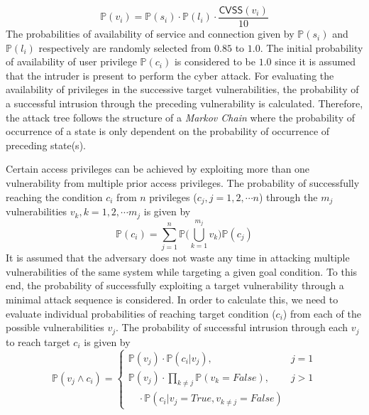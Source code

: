 \begin{equation}
\mathbb{P}(v_i)=\mathbb{P}(s_i)\cdot\mathbb{P}(l_i)\cdot\dfrac{\mathsf{CVSS}(v_i)}{10}
\end{equation}
The probabilities of availability of service and connection given by $\mathbb{P}(s_i)$ and $\mathbb{P}(l_i)$ respectively are randomly selected from $0.85$ to $1.0$. The initial probability of availability of user privilege $\mathbb{P}(c_i)$ is considered to be $1.0$ since it is assumed that the intruder is present to perform the cyber attack. For evaluating the availability of privileges in the successive target vulnerabilities, the probability of a successful intrusion through the preceding vulnerability is calculated. Therefore, the attack tree follows the structure of a \textit{Markov Chain} where the probability of occurrence of a state is only dependent on the probability of occurrence of preceding state(s). 

Certain access privileges can be achieved by exploiting more than one vulnerability from multiple prior access privileges. The probability of successfully reaching the condition $c_i$ from $n$ privileges ($c_j,j=1,2,\cdots n$) through the $m_j$ vulnerabilities $v_k,k=1,2,\cdots m_j$ is given by
\begin{equation}
\mathbb{P}(c_i)=\sum_{j=1}^{n}{\mathbb{P}\bigg(\bigcup_{k=1}^{m_j}v_k\bigg)\mathbb{P}(c_j)}
\end{equation} 
It is assumed that the adversary does not waste any time in attacking multiple vulnerabilities of the same system while targeting a given goal condition. To this end, the probability of successfully exploiting a target vulnerability through a minimal attack sequence is considered. In order to calculate this, we need to evaluate individual probabilities of reaching target condition ($c_i$) from each of the possible vulnerabilities $v_j$. The probability of successful intrusion through each $v_j$ to reach target $c_i$ is given by
\begin{equation}
\mathbb{P}(v_j\wedge c_i)=
\begin{cases}
\mathbb{P}(v_j)\cdot\mathbb{P}(c_i|v_j), &j=1\\
\mathbb{P}(v_j)\cdot\prod_{k\neq j}\mathbb{P}(v_k=False), &j>1\\
\quad\cdot\mathbb{P}(c_i|v_j=True,v_{k\neq j}=False) &
\end{cases}
\end{equation}